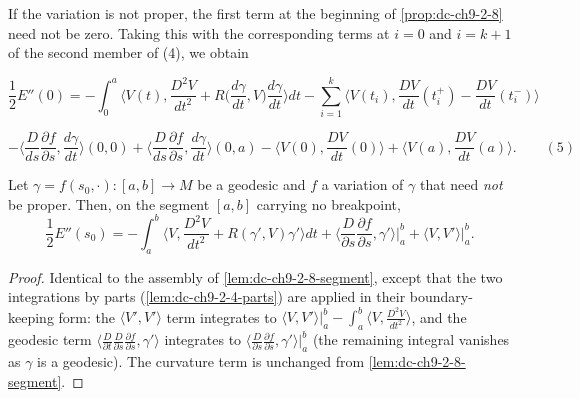 \begin{remark}
  \label{rem:dc-ch9-2-9}
  \sketch
  If the variation is not proper, the first term at the beginning of \cref{prop:dc-ch9-2-8}
  need not be zero. Taking this with the corresponding terms at $i=0$ and $i=k+1$ of
  the second member of (4), we obtain

  $$
  \frac{1}{2}E''(0)=-\int_0^a\Big\langle V(t),\frac{D^2 V}{dt^2}+R\Big(\frac{d\gamma}{dt},V\Big)\frac{d\gamma}{dt}\Big\rangle dt-\sum_{i=1}^k\Big\langle V(t_i),\frac{DV}{dt}(t_i^+)-\frac{DV}{dt}(t_i^-)\Big\rangle
  $$

  $$
  -\Big\langle\frac{D}{ds}\frac{\partial f}{\partial s},\frac{d\gamma}{dt}\Big\rangle(0,0)+\Big\langle\frac{D}{ds}\frac{\partial f}{\partial s},\frac{d\gamma}{dt}\Big\rangle(0,a)-\Big\langle V(0),\frac{DV}{dt}(0)\Big\rangle+\Big\langle V(a),\frac{DV}{dt}(a)\Big\rangle.\qquad(5)
  $$
\end{remark}
\begin{lemma}
  \label{lem:dc-ch9-2-9-segment}
  \leanok
  Let $\gamma=f(s_0,\cdot):[a,b]\to M$ be a geodesic and $f$ a variation of $\gamma$ that need
  \emph{not} be proper. Then, on the segment $[a,b]$ carrying no breakpoint,
  $$
  \frac{1}{2}E''(s_0)=-\int_a^b\Big\langle V,\frac{D^2 V}{dt^2}+R(\gamma',V)\gamma'\Big\rangle dt
    +\Big\langle\frac{D}{\partial s}\frac{\partial f}{\partial s},\gamma'\Big\rangle\Big|_a^b
    +\big\langle V,V'\big\rangle\Big|_a^b .
  $$

\end{lemma}
\begin{proof}
  \leanok
  \sketch
  Identical to the assembly of \cref{lem:dc-ch9-2-8-segment}, except that the two integrations
  by parts (\cref{lem:dc-ch9-2-4-parts}) are applied in their boundary-keeping form: the
  $\langle V',V'\rangle$ term integrates to
  $\langle V,V'\rangle|_a^b-\int_a^b\langle V,\frac{D^2V}{dt^2}\rangle$, and the geodesic term
  $\langle\frac{D}{\partial t}\frac{D}{\partial s}\frac{\partial f}{\partial s},\gamma'\rangle$
  integrates to $\langle\frac{D}{\partial s}\frac{\partial f}{\partial s},\gamma'\rangle|_a^b$
  (the remaining integral vanishes as $\gamma$ is a geodesic). The curvature term is unchanged
  from \cref{lem:dc-ch9-2-8-segment}.
\end{proof}
